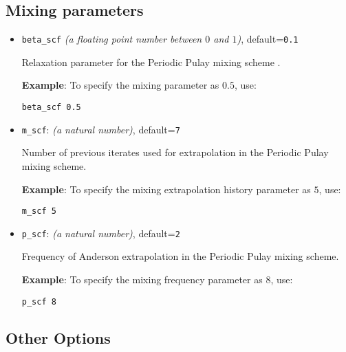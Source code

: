 \documentclass[12pt]{report}
\begin{document}

\subsection{Mixing parameters}

\begin{itemize}
\item\texttt{beta\_scf} {\it{(a floating point number between $0$ and $1$)}}, default=\texttt{0.1}

Relaxation parameter for the Periodic Pulay mixing scheme \cite{banerjee2015periodic}.

{\bf{Example}}: To specify the mixing parameter as $0.5$, use: 

\texttt{beta\_scf 0.5}  

\item\texttt{m\_scf}: {\it{(a natural number)}}, default=\texttt{7}

Number of previous iterates used for extrapolation in the Periodic Pulay mixing scheme.

{\bf{Example}}: To specify the mixing extrapolation history parameter as $5$, use: 

\texttt{m\_scf 5}  

\item\texttt{p\_scf}: {\it{(a natural number)}}, default=\texttt{2}

Frequency of Anderson extrapolation in the Periodic Pulay mixing scheme.
 
{\bf{Example}}: To specify the mixing frequency parameter as $8$, use: 

\texttt{p\_scf 8}  

\end{itemize}


\subsection{Other Options}
\end{document}

